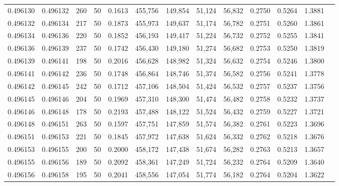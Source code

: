 \begin{tabular}{rrrrrrrrrrrrr}
0.496130 & 0.496132 &   260 &  50 &                                     0.1613 & 455,756 & 149,854 &  51,124 &  56,832 & 0.2750 & 0.5264 & 1.3881 \\
0.496132 & 0.496134 &   217 &  50 &                                     0.1873 & 455,973 & 149,637 &  51,174 &  56,782 & 0.2751 & 0.5260 & 1.3861 \\
0.496134 & 0.496136 &   220 &  50 &                                     0.1852 & 456,193 & 149,417 &  51,224 &  56,732 & 0.2752 & 0.5255 & 1.3841 \\
0.496136 & 0.496139 &   237 &  50 &                                     0.1742 & 456,430 & 149,180 &  51,274 &  56,682 & 0.2753 & 0.5250 & 1.3819 \\
0.496139 & 0.496141 &   198 &  50 &                                     0.2016 & 456,628 & 148,982 &  51,324 &  56,632 & 0.2754 & 0.5246 & 1.3800 \\
0.496141 & 0.496142 &   236 &  50 &                                     0.1748 & 456,864 & 148,746 &  51,374 &  56,582 & 0.2756 & 0.5241 & 1.3778 \\
0.496142 & 0.496145 &   242 &  50 &                                     0.1712 & 457,106 & 148,504 &  51,424 &  56,532 & 0.2757 & 0.5237 & 1.3756 \\
0.496145 & 0.496146 &   204 &  50 &                                     0.1969 & 457,310 & 148,300 &  51,474 &  56,482 & 0.2758 & 0.5232 & 1.3737 \\
0.496146 & 0.496148 &   178 &  50 &                                     0.2193 & 457,488 & 148,122 &  51,524 &  56,432 & 0.2759 & 0.5227 & 1.3721 \\
0.496148 & 0.496151 &   263 &  50 &                                     0.1597 & 457,751 & 147,859 &  51,574 &  56,382 & 0.2761 & 0.5223 & 1.3696 \\
0.496151 & 0.496153 &   221 &  50 &                                     0.1845 & 457,972 & 147,638 &  51,624 &  56,332 & 0.2762 & 0.5218 & 1.3676 \\
0.496153 & 0.496155 &   200 &  50 &                                     0.2000 & 458,172 & 147,438 &  51,674 &  56,282 & 0.2763 & 0.5213 & 1.3657 \\
0.496155 & 0.496156 &   189 &  50 &                                     0.2092 & 458,361 & 147,249 &  51,724 &  56,232 & 0.2764 & 0.5209 & 1.3640 \\
0.496156 & 0.496158 &   195 &  50 &                                     0.2041 & 458,556 & 147,054 &  51,774 &  56,182 & 0.2764 & 0.5204 & 1.3622 \\

\end{tabular}

